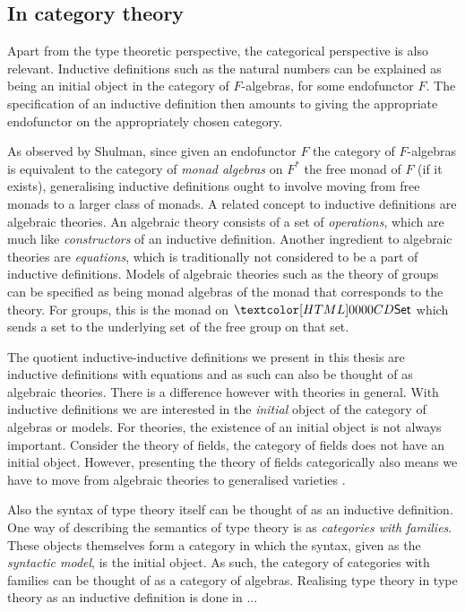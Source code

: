 \subsection{In category theory}
Apart from the type theoretic perspective, the categorical perspective
is also relevant. Inductive definitions such as the natural numbers
can be explained as being an initial object in the category of
$F$-algebras, for some endofunctor $F$. The specification of an
inductive definition then amounts to giving the appropriate
endofunctor on the appropriately chosen category.

As observed by Shulman, since given an endofunctor $F$ the category of
$F$-algebras is equivalent to the category of \emph{monad algebras} on
$F^*$ the free monad of $F$ (if it exists), generalising inductive
definitions ought to involve moving from free monads to a larger class
of monads. A related concept to inductive definitions are algebraic
theories. An algebraic theory consists of a set of \emph{operations},
which are much like \emph{constructors} of an inductive
definition. Another ingredient to algebraic theories are
\emph{equations}, which is traditionally not considered to be a part
of inductive definitions. Models of algebraic theories such as the
theory of groups can be specified as being monad algebras of the monad
that corresponds to the theory. For groups, this is the monad on
$\Set$ which sends a set to the underlying set of the free group on
that set.

The quotient inductive-inductive definitions we present in this thesis
are inductive definitions with equations and as such can also be
thought of as algebraic theories. There is a difference however with
theories in general. With inductive definitions we are interested in
the \emph{initial} object of the category of algebras or models. For
theories, the existence of an initial object is not always
important. Consider the theory of fields, the category of fields does
not have an initial object. However, presenting the theory of fields
categorically also means we have to move from algebraic theories to
generalised varieties \cite{Adamek2001}. 

Also the syntax of type theory itself can be thought of as an
inductive definition. One way of describing the semantics of type
theory is as \emph{categories with families}. These objects themselves
form a category in which the syntax, given as the \emph{syntactic
  model}, is the initial object. As such, the category of categories
with families can be thought of as a category of algebras. Realising
type theory in type theory as an inductive definition is done in ...


